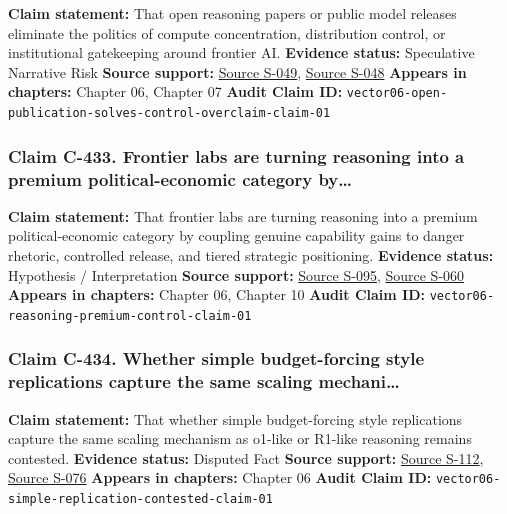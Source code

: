 \documentclass[
  american,
  11pt,
  letterpaper,
]{article}
\begin{document}
\textbf{Claim statement:} That open reasoning papers or public model
releases eliminate the politics of compute concentration, distribution
control, or institutional gatekeeping around frontier AI.
\textbf{Evidence status:} Speculative Narrative Risk \textbf{Source
support:} \hyperref[source-s-049-deepseek-v3-technical-report]{Source
S-049},
\hyperref[source-s-048-deepseek-r1-incentivizing-reasoning-capability-in-llms-via-reinforcement-learning]{Source
S-048} \textbf{Appears in chapters:} Chapter 06, Chapter 07
\textbf{Audit Claim ID:}
\texttt{vector06-open-publication-solves-control-overclaim-claim-01}

\subsubsection{Claim C-433. Frontier labs are turning reasoning into a
premium political-economic category
by\ldots{}}\label{claim-c-433-frontier-labs-are-turning-reasoning-into-a-premium-political-economic-category-by}

\textbf{Claim statement:} That frontier labs are turning reasoning into
a premium political-economic category by coupling genuine capability
gains to danger rhetoric, controlled release, and tiered strategic
positioning. \textbf{Evidence status:} Hypothesis / Interpretation
\textbf{Source support:}
\hyperref[source-s-095-openai-o1-system-card]{Source S-095},
\hyperref[source-s-060-openai-acknowledges-new-models-increase-risk-of-misuse-to-create-bioweapons]{Source
S-060} \textbf{Appears in chapters:} Chapter 06, Chapter 10
\textbf{Audit Claim ID:}
\texttt{vector06-reasoning-premium-control-claim-01}

\subsubsection{Claim C-434. Whether simple budget-forcing style
replications capture the same scaling
mechani\ldots{}}\label{claim-c-434-whether-simple-budget-forcing-style-replications-capture-the-same-scaling-mechani}

\textbf{Claim statement:} That whether simple budget-forcing style
replications capture the same scaling mechanism as o1-like or R1-like
reasoning remains contested. \textbf{Evidence status:} Disputed Fact
\textbf{Source support:}
\hyperref[source-s-112-s1-simple-test-time-scaling]{Source S-112},
\hyperref[source-s-076-it-s-not-that-simple-an-analysis-of-simple-test-time-scaling]{Source
S-076} \textbf{Appears in chapters:} Chapter 06 \textbf{Audit Claim ID:}
\texttt{vector06-simple-replication-contested-claim-01}
\end{document}

